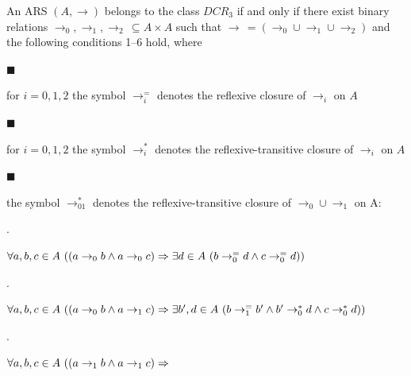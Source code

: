  
An ARS $(A,\to)$ belongs to the class $DCR_{3}$ if and only if there exist binary relations $\to_{0},\to_{1},\to_{2}\,\subseteq A\times A$ such that $\to\,=(\to_{0}\cup\to_{1}\cup\to_{2})$ and the following conditions 1–6 hold, where\par
  
\par\noindent  $\blacksquare$ 
 
for $i=0,1,2$ the symbol $\to_{i}^{=}$ denotes the reflexive closure of $\to_{i}$ on $A$\par
 
 
 
\par\noindent  $\blacksquare$ 
 
for $i=0,1,2$ the symbol $\to_{i}^{*}$ denotes the reflexive-transitive closure of $\to_{i}$ on $A$\par
 
 
 
\par\noindent  $\blacksquare$ 
 
the symbol $\to_{01}^{*}$ denotes the reflexive-transitive closure of $\to_{0}\cup\to_{1}$ on A:\par
  
\par{}. 
 
$\forall a,b,c\in A\leavevmode\nobreak\ ((a\to_{0}b\wedge a\to_{0}c)\Rightarrow%
\exists d\in A\leavevmode\nobreak\ (b\to_{0}^{=}d\wedge c\to_{0}^{=}d))$\par
 
 
 
\par{}. 
 
$\forall a,b,c\in A\leavevmode\nobreak\ ((a\to_{0}b\wedge a\to_{1}c)\Rightarrow%
\exists b^{\prime},d\in A\leavevmode\nobreak\ (b\to_{1}^{=}b^{\prime}\wedge b^%
{\prime}\to_{0}^{*}d\wedge c\to_{0}^{*}d))$\par
 
 
 
\par{}. 
 
$\forall a,b,c\in A\leavevmode\nobreak\ ((a\to_{1}b\wedge a\to_{1}c)\Rightarrow$\par
 
